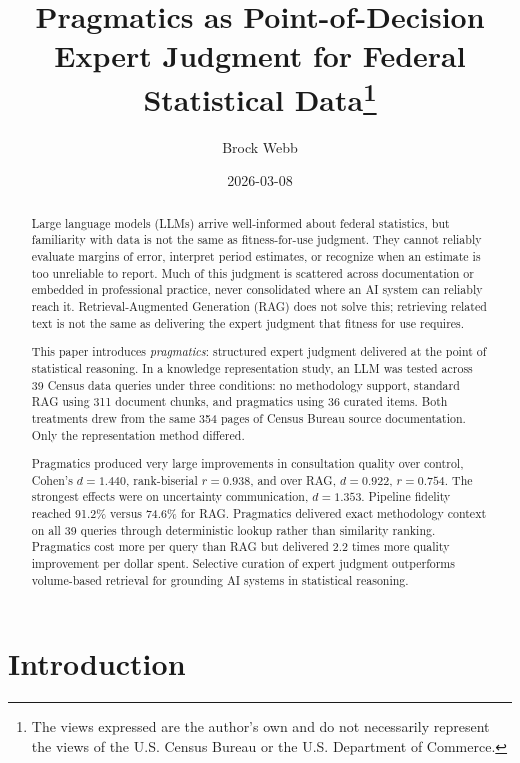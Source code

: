 \documentclass[
  11pt,
  letterpaper,
]{article}
\title{Pragmatics as Point-of-Decision Expert Judgment for Federal
Statistical Data\thanks{The views expressed are the author's own and do
not necessarily represent the views of the U.S. Census Bureau or the
U.S. Department of Commerce.}}
\author{Brock Webb}
\date{2026-03-08}
\begin{document}
\maketitle
\begin{abstract}
Large language models (LLMs) arrive well-informed about federal
statistics, but familiarity with data is not the same as fitness-for-use
judgment. They cannot reliably evaluate margins of error, interpret
period estimates, or recognize when an estimate is too unreliable to
report. Much of this judgment is scattered across documentation or
embedded in professional practice, never consolidated where an AI system
can reliably reach it. Retrieval-Augmented Generation (RAG) does not
solve this; retrieving related text is not the same as delivering the
expert judgment that fitness for use requires.

This paper introduces \emph{pragmatics}: structured expert judgment
delivered at the point of statistical reasoning. In a knowledge
representation study, an LLM was tested across 39 Census data queries
under three conditions: no methodology support, standard RAG using 311
document chunks, and pragmatics using 36 curated items. Both treatments
drew from the same 354 pages of Census Bureau source documentation. Only
the representation method differed.

Pragmatics produced very large improvements in consultation quality over
control, Cohen's \(d=1.440\), rank-biserial \(r=0.938\), and over RAG,
\(d=0.922\), \(r=0.754\). The strongest effects were on uncertainty
communication, \(d=1.353\). Pipeline fidelity reached 91.2\% versus
74.6\% for RAG. Pragmatics delivered exact methodology context on all 39
queries through deterministic lookup rather than similarity ranking.
Pragmatics cost more per query than RAG but delivered 2.2 times more
quality improvement per dollar spent. Selective curation of expert
judgment outperforms volume-based retrieval for grounding AI systems in
statistical reasoning.
\end{abstract}


\section{Introduction}\label{introduction}
\end{document}
